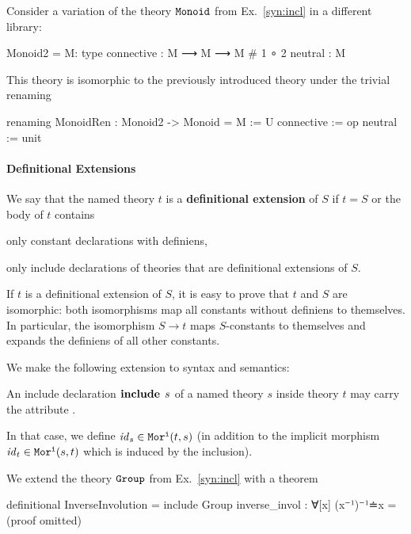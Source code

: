 \begin{example}[Renaming]
Consider a variation of the theory $\operatorname{\mathtt{Monoid}}$ from Ex.~\ref{syn:incl} in a different library:
\begin{mmtcode}
Monoid2 =
  M: type
  connective : M ⟶ M ⟶ M	 # 1 ∘ 2 
  neutral	: M
\end{mmtcode}
This theory is isomorphic to the previously introduced theory  under the trivial renaming
	\begin{mmtcode}
renaming MonoidRen : Monoid2 -> Monoid =
  M 		:= U
  connective 	:= op 
  neutral	:= unit
\end{mmtcode}
\end{example}

\paragraph{Definitional Extensions}
We say that the named theory $t$ is a \textbf{definitional extension} of $S$ if $t=S$ or the body of $t$ contains
\begin{compactitem}
 \item only constant declarations with definiens,
 \item only include declarations of theories that are definitional extensions of $S$.
\end{compactitem}

If $t$ is a definitional extension of $S$, it is easy to prove that $t$ and $S$ are isomorphic: both isomorphisms map all constants without definiens to themselves. In particular, the isomorphism $S\to t$ maps $S$-constants to themselves and expands the definiens of all other constants.

We make the following extension to syntax and semantics:
\begin{compactitem}
  \item An include declaration $\operatorname{\mathbf{include}}{\;s}$ of a named theory $s$ inside theory $t$ may carry the attribute .
  \item In that case, we define $\mathit{id}_{s}\in\mathtt{Mor^i}(t,s)$ (in addition to the implicit morphism $\mathit{id}_{t}\in\mathtt{Mor^i}(s,t)$ which is induced by the inclusion).
\end{compactitem}

\begin{example}
We extend the theory $\operatorname{\mathtt{Group}}$ from Ex.~\ref{syn:incl} with a theorem
\begin{mmtcode}
definitional InverseInvolution =
  include Group
  inverse_invol : ∀[x] (x⁻¹)⁻¹≐x  =  (proof omitted)
\end{mmtcode}
\end{example}

